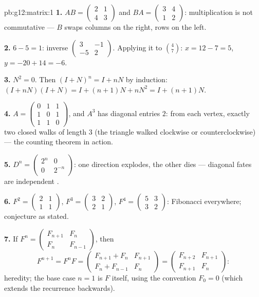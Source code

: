 \begin{solution}{pb:g12:matrix:1}
\textbf{1.} $AB = \begin{pmatrix} 2 & 1\\ 4 & 3\end{pmatrix}$
and $BA = \begin{pmatrix} 3 & 4\\ 1 & 2\end{pmatrix}$: 
multiplication is not commutative --- $B$ swaps columns on the
right, rows on the left.

\textbf{2.}  $6 - 5 = 1$: inverse
$\begin{pmatrix} 3 & -1\\ -5 & 2\end{pmatrix}$. Applying it to
$\binom{4}{7}$: $x = 12 - 7 = 5$, $y = -20 + 14 = -6$.

\textbf{3.} $N^2 = 0$. Then $(I + N)^n = I + nN$ by induction:
$(I + nN)(I + N) = I + (n+1)N + nN^2 = I + (n+1)N$.

\textbf{4.} $A = \begin{pmatrix} 0&1&1\\ 1&0&1\\ 1&1&0
\end{pmatrix}$, and $A^3$ has diagonal entries $2$: from each
vertex, exactly two closed walks of length $3$ (the triangle
walked clockwise or counterclockwise) --- the counting theorem
in action.

\textbf{5.} $D^n = \begin{pmatrix} 2^n & 0\\ 0 & 2^{-n}
\end{pmatrix}$: one direction explodes, the other dies ---
diagonal fates are independent .

\textbf{6.} $F^2 = \begin{pmatrix} 2 & 1\\ 1 & 1\end{pmatrix}$,
$F^3 = \begin{pmatrix} 3 & 2\\ 2 & 1\end{pmatrix}$,
$F^4 = \begin{pmatrix} 5 & 3\\ 3 & 2\end{pmatrix}$: Fibonacci
everywhere; conjecture as stated.

\textbf{7.} If $F^n = \begin{pmatrix} F_{n+1} & F_n\\ F_n &
F_{n-1}\end{pmatrix}$, then
\[
F^{n+1} = F^n F =
\begin{pmatrix} F_{n+1} + F_n & F_{n+1}\\
F_n + F_{n-1} & F_n \end{pmatrix}
= \begin{pmatrix} F_{n+2} & F_{n+1}\\ F_{n+1} & F_n
\end{pmatrix} :
\]
heredity; the base case $n = 1$ is $F$ itself, using the
convention $F_0 = 0$ (which extends the recurrence backwards).


\end{solution}
